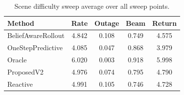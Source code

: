 \begin{table}[t]
\centering
\scriptsize
\setlength{\tabcolsep}{3pt}
\caption{Scene difficulty sweep average over all sweep points.}
\label{tab:sweep_summary}
\begin{tabular}{lcccc}
\toprule
Method & Rate & Outage & Beam & Return \\
\midrule
BeliefAwareRollout & 4.842 & 0.108 & 0.749 & 4.575 \\
OneStepPredictive & 4.085 & 0.047 & 0.868 & 3.979 \\
Oracle & 6.020 & 0.003 & 0.918 & 5.998 \\
ProposedV2 & 4.976 & 0.074 & 0.795 & 4.790 \\
Reactive & 4.991 & 0.105 & 0.746 & 4.728 \\
\bottomrule
\end{tabular}
\end{table}
